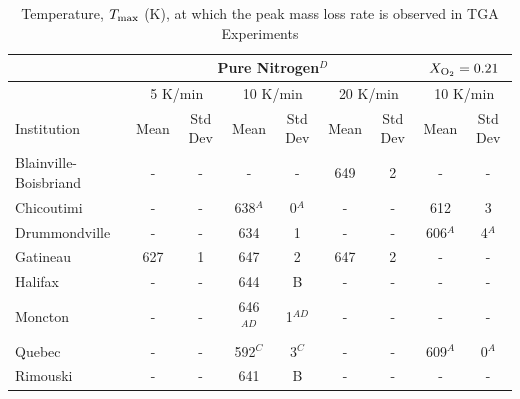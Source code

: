 \documentclass{book}
\begin{document}
\begin{table}[ht]
\caption{Temperature, $T_{\rm max}$ (K), at which the peak mass loss rate is observed in TGA Experiments}
\label{Table_9}
\begin{center}
\begin{tabular}{|l|cc|cc|cc|cc|}
\hline
                        & \multicolumn{6}{|c|}{Pure Nitrogen$^D$} & \multicolumn{2}{|c|}{$X_{\rm O_2}=0.21$}                                                       \\  \hline
                        & \multicolumn{2}{|c|}{5 K/min} & \multicolumn{2}{|c|}{10 K/min}    & \multicolumn{2}{|c|}{20 K/min} & \multicolumn{2}{|c|}{10 K/min}      \\  \hline
Institution             & Mean        & Std Dev         & Mean           & Std Dev          & Mean       & Std Dev           & Mean        & Std Dev               \\  \hline
Blainville-Boisbriand   & -           & -               & -              & -                & 649        & 2                 & -           & -                     \\
Chicoutimi              & -           & -               & 638$^A$        & 0$^A$            & -          & -                 & 612         & 3                     \\
Drummondville           & -           & -               & 634            & 1                & -          & -                 & 606$^A$     & 4$^A$                 \\
Gatineau                & 627         & 1               & 647            & 2                & 647        & 2                 & -           & -                     \\
Halifax                 & -           & -               & 644            & B                & -          & -                 & -           & -                     \\
Moncton                 & -           & -               & 646$^{AD}$     & 1$^{AD}$         & -          & -                 & -           & -                     \\
Quebec                  & -           & -               & 592$^C$        & 3$^C$            & -          & -                 & 609$^A$     & 0$^A$                 \\
Rimouski                & -           & -               & 641            & B                & -          & -                 & -           & -                     \\

\end{tabular}
\end{center}
\end{table}
\end{document}
